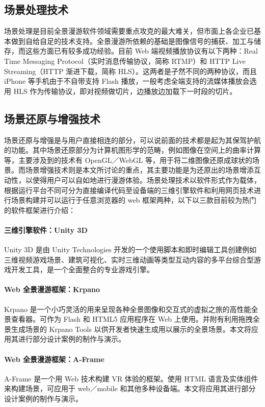 \subsection{场景处理技术}
场景处理是目前全景漫游软件领域需要重点攻克的最大难关，但市面上各企业已基本做到自给自足的技术支持。全景漫游所依赖的基础是图像信号的捕获、加工与储存，而这些方面已有较多成功经验。目前 Web 端视频播放协议有以下两种：Real Time Messaging Protocol（实时消息传输协议，简称 RTMP）和 HTTP Live Streaming（HTTP 渐进下载，简称 HLS）。这两者是孑然不同的两种协议，而且 iPhone 等手机由于不自带支持 Flash 播放，一般考虑全端支持的流媒体播放会选用 HLS 作为传输协议，即对视频做切片，边播放边加载下一时段的切片。

\subsection{场景还原与增强技术}
场景还原与增强是与用户直接相连的部分，可以说前面的技术都是起为其保驾护航的功能。其中场景还原部分为计算机图形学的范畴，例如图像在空间上的曲率计算等，主要涉及到的技术有 OpenGL／WebGL 等，用于将二维图像还原成球状的场景。而场景增强技术则是本文所讨论的重点，其主要功能是为还原出的场景增添互动性，以使得用户可以自如地进行漫游体验。场景处理技术以软件形式作为载体，根据运行平台不同可分为直接编译代码至设备端的三维引擎软件和利用网页技术进行场景构建并可以运行于任意浏览器的 web 框架两种，以下以三款目前较为热门的软件框架进行介绍：

\paragraph{三维引擎软件：Unity 3D}

Unity 3D 是由 Unity Technologies 开发的一个使用脚本和即时编辑工具创建例如三维视频游戏场景、建筑可视化、实时三维动画等类型互动内容的多平台综合型游戏开发工具，是一个全面整合的专业游戏引擎。

\paragraph{Web 全景漫游框架：Krpano}
Krpano 是一个小巧灵活的用来呈现各种全景图像和交互式的虚拟之旅的高性能全景查看器。可作为 Flash 和 HTML5 应用程序在 Web 上使用。并附有利用拖拽全景生成场景的 Krpano Tools 以供开发者快速生成用以展示的全景场景。本文将应用其进行部分设计案例的制作与演示。

\paragraph{Web 全景漫游框架：A-Frame}
A-Frame 是一个用 Web 技术构建 VR 体验的框架。使用 HTML 语言及实体组件来构建场景，可应用于 web／mobile 和其他多种设备端。本文将应用其进行部分设计案例的制作与演示。

